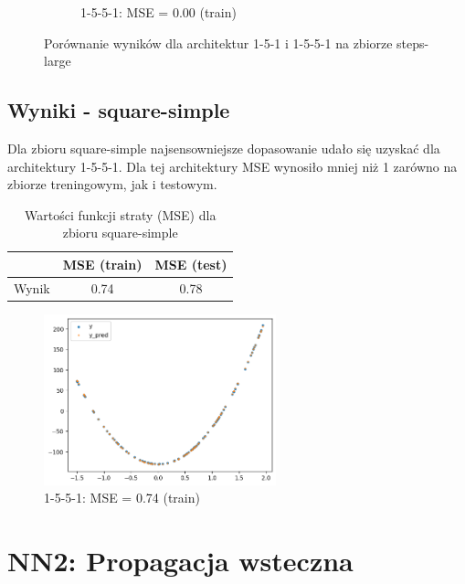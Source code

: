 \documentclass{article}
\begin{document}
\begin{figure}[H]
\begin{subfigure}[b]{0.45\textwidth}
        \caption{1-5-5-1: MSE = 0.00 (train)}
    \end{subfigure}
    \caption{Porównanie wyników dla architektur 1-5-1 i 1-5-5-1 na zbiorze steps-large}
\end{figure}
\subsection*{Wyniki - square-simple}
Dla zbioru square-simple najsensowniejsze dopasowanie udało się uzyskać dla architektury 1-5-5-1. Dla tej architektury MSE wynosiło mniej niż 1 zarówno na zbiorze treningowym, jak i testowym. 
\begin{table}[H]
    \centering
    \begin{tabular}{|c|c|c|}
        \hline
        & MSE (train) & MSE (test) \\
        \hline
        Wynik & 0.74 & 0.78 \\
        \hline
    \end{tabular}
    \caption{Wartości funkcji straty (MSE) dla zbioru square-simple}
\end{table}
\begin{figure}[H]
    \centering
    \includegraphics[width=0.6\textwidth]{img/nn1/square-simple_train_1-5-5-1.png}
    \caption{1-5-5-1: MSE = 0.74 (train)}
\end{figure}

\section*{NN2: Propagacja wsteczna}
\end{document}
